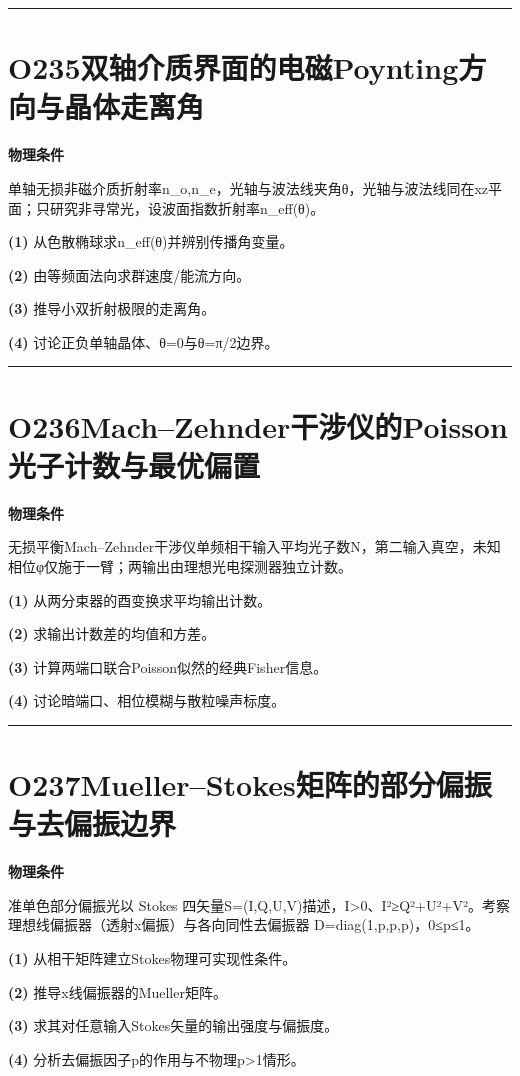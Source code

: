 \documentclass[UTF8,a4paper,11pt,oneside,openany]{ctexbook}
\begin{document}
\par\bigskip\hrule\bigskip
\section*{O235\quad 双轴介质界面的电磁Poynting方向与晶体走离角}
\textbf{物理条件}\par 单轴无损非磁介质折射率n\_o,n\_e，光轴与波法线夹角θ，光轴与波法线同在xz平面；只研究非寻常光，设波面指数折射率n\_eff(θ)。
\par\noindent\textbf{(1)} 从色散椭球求n\_eff(θ)并辨别传播角变量。
\par\noindent\textbf{(2)} 由等频面法向求群速度/能流方向。
\par\noindent\textbf{(3)} 推导小双折射极限的走离角。
\par\noindent\textbf{(4)} 讨论正负单轴晶体、θ=0与θ=π/2边界。

\par\bigskip\hrule\bigskip
\section*{O236\quad Mach–Zehnder干涉仪的Poisson光子计数与最优偏置}
\textbf{物理条件}\par 无损平衡Mach–Zehnder干涉仪单频相干输入平均光子数N，第二输入真空，未知相位φ仅施于一臂；两输出由理想光电探测器独立计数。
\par\noindent\textbf{(1)} 从两分束器的酉变换求平均输出计数。
\par\noindent\textbf{(2)} 求输出计数差的均值和方差。
\par\noindent\textbf{(3)} 计算两端口联合Poisson似然的经典Fisher信息。
\par\noindent\textbf{(4)} 讨论暗端口、相位模糊与散粒噪声标度。

\par\bigskip\hrule\bigskip
\section*{O237\quad Mueller–Stokes矩阵的部分偏振与去偏振边界}
\textbf{物理条件}\par 准单色部分偏振光以 Stokes 四矢量S=(I,Q,U,V)描述，I>0、I²≥Q²+U²+V²。考察理想线偏振器（透射x偏振）与各向同性去偏振器 D=diag(1,p,p,p)，0≤p≤1。
\par\noindent\textbf{(1)} 从相干矩阵建立Stokes物理可实现性条件。
\par\noindent\textbf{(2)} 推导x线偏振器的Mueller矩阵。
\par\noindent\textbf{(3)} 求其对任意输入Stokes矢量的输出强度与偏振度。
\par\noindent\textbf{(4)} 分析去偏振因子p的作用与不物理p>1情形。
\end{document}
